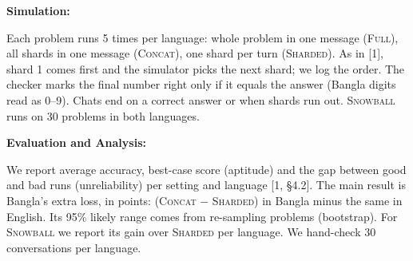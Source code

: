 \documentclass[11pt,a4paper]{article}
\newcommand{\subhead}[1]{\par\needspace{3\baselineskip}\vspace{2pt}\textbf{#1}\par\vspace{-3pt}}
\begin{document}
\subhead{Simulation:}
Each problem runs 5 times per language: whole problem in one message (\textsc{Full}), all shards in one message (\textsc{Concat}), one shard per turn (\textsc{Sharded}). As in [1], shard 1 comes first and the simulator picks the next shard; we log the order. The checker marks the final number right only if it equals the answer (Bangla digits read as 0--9). Chats end on a correct answer or when shards run out. \textsc{Snowball} runs on 30 problems in both languages.
\figsim

\subhead{Evaluation and Analysis:}
We report average accuracy, best-case score (aptitude) and the gap between good and bad runs (unreliability) per setting and language [1, \S4.2]. The main result is Bangla's extra loss, in points: (\textsc{Concat} $-$ \textsc{Sharded}) in Bangla minus the same in English. Its 95\% likely range comes from re-sampling problems (bootstrap). For \textsc{Snowball} we report its gain over \textsc{Sharded} per language. We hand-check 30 conversations per language.
\figeval
\end{document}
